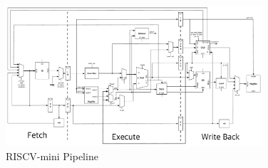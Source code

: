 \begin{figure}
	\centering
	\includegraphics[width=0.85\textwidth,height=\textheight,keepaspectratio]{images/riscv_mini.pdf}
	\caption{RISCV-mini Pipeline}
	\label{fig:riscv_mini}
\end{figure}